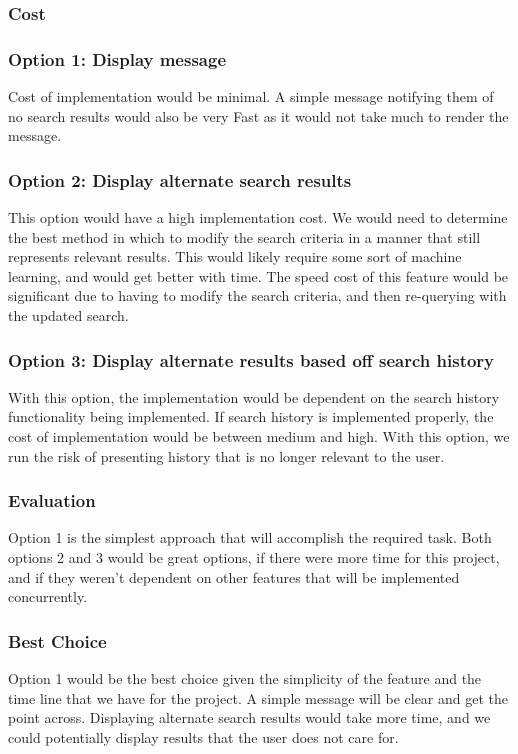 \documentclass[journal,compsoc, 10pt, draftclsnofoot, onecolumn]{IEEEtran}
\begin{document}
\subsubsection{Cost}
\subsubsection*{Option 1: Display message}
Cost of implementation would be minimal. A simple message notifying them of no 
search results would also be very Fast as it would not take much to render the 
message. 
\subsubsection*{Option 2: Display alternate search results}
This option would have a high implementation cost. We would need to determine 
the best method in which to modify the search criteria in a manner that still 
represents relevant results. This would likely require some sort of machine 
learning, and would get better with time. The speed cost of this feature would 
be significant due to having to modify the search criteria, and then 
re-querying with the updated search.
\subsubsection*{Option 3: Display alternate results based off search history}
With this option, the implementation would be dependent on the search history 
functionality being implemented. If search history is implemented properly, 
the cost of implementation would be between medium and high. With this option, 
we run the risk of presenting history that is no longer relevant to the user. 
\subsubsection{Evaluation}
Option 1 is the simplest approach that will accomplish the required task. Both options 2 and 3 would be great options, if there were more time for this project, and if they weren't dependent on other features that will be implemented concurrently.
\subsubsection{Best Choice}
Option 1 would be the best choice given the simplicity of the feature and the 
time line that we have for the project. A simple message will be clear and get 
the point across. Displaying alternate search results would take more time, 
and we could potentially display results that the user does not care for.
\end{document}

